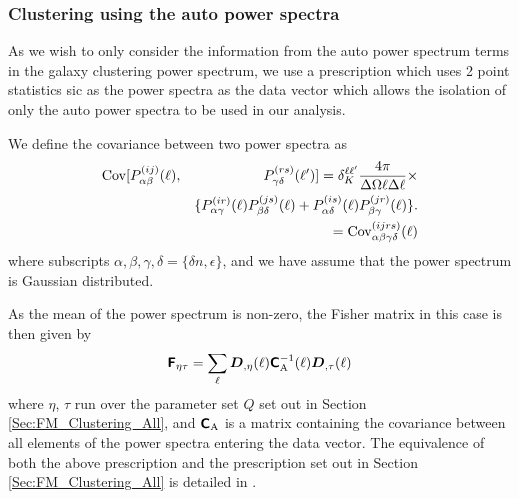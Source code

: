 \documentclass[useAMS,usenatbib,times,letter,amssymb]{mn2e}
\def\be{\begin{equation}}
\def\ee{\end{equation}}
\def\bea{\begin{eqnarray}}
\def\eea{\end{eqnarray}}
\newcommand{\bm}[1]{\mbox{\boldmath{$#1$}}}   %
\begin{document}
\subsubsection{Clustering using the auto power spectra}\label{Sec:FM_Clustering_Auto}

As we wish to only consider the information from the auto power spectrum terms in the galaxy clustering power spectrum, we use a prescription which uses 2 point statistics sic as the power spectra as the data vector which allows the isolation of only the auto power spectra to be used in our analysis. 

We define the covariance between two power spectra as 
\bea\label{Eqn:Cov2pt}
&{\rm Cov}[ P^{(ij)}_{\alpha \beta}(\ell),& P^{(rs)}_{\gamma \delta }(\ell')] = \delta_K^{\ell\ell'}\frac{4\pi}{\Delta\Omega\ell\Delta\ell}\times\\
&&\{P^{(ir)}_{\alpha\gamma}(\ell)P^{(js)}_{\beta\delta}(\ell)+P^{(is)}_{\alpha\delta}(\ell)P^{(jr)}_{\beta\gamma}(\ell)\}.\nonumber\\
&& = {\rm Cov}_{\alpha\beta\gamma\delta}^{(ijrs)}(\ell)
\eea
where subscripts $\alpha,\beta,\gamma,\delta = \{\delta n, \epsilon\}$, and we have assume that the power spectrum is Gaussian distributed.

As the mean of the power spectrum is non-zero, the Fisher matrix in this case is then given by
\be\label{Eqn:FM2pt}
\mathbfss{F}_{\eta\tau} = \sum_\ell \bm{D}_{,\eta}(\ell) \mathbfss{C}_{\rm A}^{-1}(\ell) \bm{D}_{,\tau}(\ell)
\ee
where $\eta$, $\tau$ run over the parameter set $Q$ set out in Section \ref{Sec:FM_Clustering_All}, and $\textbf{\textsf{C}}_{\rm A}$ is a matrix containing the covariance between all elements of the power spectra entering the data vector. The equivalence of both the above prescription and the prescription set out in Section \ref{Sec:FM_Clustering_All} is detailed in \cite{Joachimi:2011p2014}.
\end{document}
